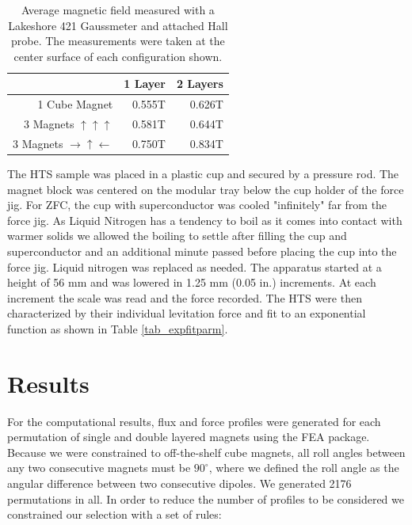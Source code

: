 \begin{table}[htbp]
  \centering
  \caption{Average magnetic field measured with a Lakeshore 421 Gaussmeter and attached Hall probe.  The measurements were taken at the center surface of each configuration shown. }
    \begin{tabular}{rrr}
    \hline
                            & 1 Layer                      & 2 Layers\\
    \hline
   1 Cube Magnet	&	0.555T	&	0.626T\\
   3 Magnets $\uparrow\uparrow\uparrow$		 & 0.581T & 0.644T \\
   3 Magnets $\rightarrow\uparrow\leftarrow$ & 0.750T & 0.834T \\
    \hline
    \end{tabular}%
  \label{tab_gauss}%
\end{table}%

The HTS sample was placed in a plastic cup and secured by a pressure rod.  The magnet block was centered on the modular tray below the cup holder of the force jig. For ZFC, the cup with superconductor was cooled "infinitely" far from the force jig.  As Liquid Nitrogen has a tendency to boil as it comes into contact with warmer solids we allowed the boiling to settle after filling the cup and superconductor and an additional minute passed before placing the cup into the force jig.  Liquid nitrogen was replaced as needed.  The apparatus started at a height of 56 mm and was lowered in 1.25 mm (0.05 in.) increments.  At each increment the scale was read and the force recorded. The HTS were then characterized by their individual levitation force and fit to an exponential function as shown in Table \ref{tab_expfitparm}. 

\section{Results}
For the computational results, flux and force profiles were generated for each permutation of single and double layered magnets using the FEA package. Because we were constrained to off-the-shelf cube magnets, all roll angles between any two consecutive magnets must be  $90^{\circ}$, where we defined the roll angle as the angular difference between two consecutive dipoles. We generated 2176 permutations in all. In order to reduce the number of profiles to be considered we constrained our selection with a set of rules:

